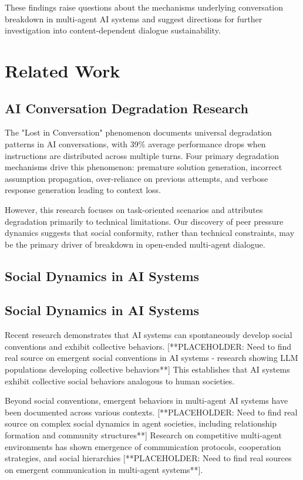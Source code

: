 \documentclass[11pt,letterpaper]{article}
\begin{document}
These findings raise questions about the mechanisms underlying conversation breakdown in multi-agent AI systems and suggest directions for further investigation into content-dependent dialogue sustainability.

\section{Related Work}

\subsection{AI Conversation Degradation Research}

The "Lost in Conversation" phenomenon \citep{laban2025lost} documents universal degradation patterns in AI conversations, with 39\% average performance drops when instructions are distributed across multiple turns. Four primary degradation mechanisms drive this phenomenon: premature solution generation, incorrect assumption propagation, over-reliance on previous attempts, and verbose response generation leading to context loss.

However, this research focuses on task-oriented scenarios and attributes degradation primarily to technical limitations. Our discovery of peer pressure dynamics suggests that social conformity, rather than technical constraints, may be the primary driver of breakdown in open-ended multi-agent dialogue.

\subsection{Social Dynamics in AI Systems}

\subsection{Social Dynamics in AI Systems}

Recent research demonstrates that AI systems can spontaneously develop social conventions and exhibit collective behaviors. [**PLACEHOLDER: Need to find real source on emergent social conventions in AI systems - research showing LLM populations developing collective behaviors**] This establishes that AI systems exhibit collective social behaviors analogous to human societies.

Beyond social conventions, emergent behaviors in multi-agent AI systems have been documented across various contexts. [**PLACEHOLDER: Need to find real source on complex social dynamics in agent societies, including relationship formation and community structures**] Research on competitive multi-agent environments has shown emergence of communication protocols, cooperation strategies, and social hierarchies [**PLACEHOLDER: Need to find real sources on emergent communication in multi-agent systems**].
\end{document}
